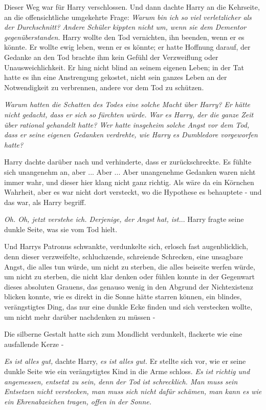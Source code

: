 Dieser Weg war für Harry verschlossen. Und dann dachte Harry an die Kehrseite,
an die offensichtliche umgekehrte Frage: \emph{Warum bin ich so viel
verletzlicher als der Durchschnitt? Andere Schüler kippten nicht um, wenn sie
dem Dementor gegenüberstanden.} Harry wollte den Tod vernichten, ihn beenden,
wenn er es könnte. Er wollte ewig leben, wenn er es könnte; er hatte Hoffnung
darauf, der Gedanke an den Tod brachte ihm kein Gefühl der Verzweiflung oder
Unausweichlichkeit. Er hing nicht blind an seinem eigenen Leben; in der Tat
hatte es ihn eine Anstrengung gekostet, nicht sein ganzes Leben an der
Notwendigkeit zu verbrennen, andere vor dem Tod zu schützen.

\emph{Warum hatten die Schatten des Todes eine solche Macht über Harry? Er hätte
nicht gedacht, dass er sich so fürchten würde. War es Harry, der die ganze Zeit
über} \emph{rational gehandelt hatte? Wer hatte insgeheim solche Angst vor dem
Tod, dass er seine eigenen Gedanken verdrehte, wie Harry es Dumbledore
vorgeworfen hatte?}

Harry dachte darüber nach und verhinderte, dass er zurückschreckte. Es fühlte
sich unangenehm an, aber ... Aber ... Aber unangenehme Gedanken waren nicht immer
wahr, und dieser hier klang nicht ganz richtig. Als wäre da ein Körnchen
Wahrheit, aber es war nicht dort versteckt, wo die Hypothese es behauptete - und
das war, als Harry begriff.

\emph{Oh. Oh, jetzt verstehe ich. Derjenige, der Angst hat, ist.}.. Harry fragte
seine dunkle Seite, was sie vom Tod hielt.

Und Harrys Patronus schwankte, verdunkelte sich, erlosch fast augenblicklich,
denn dieser verzweifelte, schluchzende, schreiende Schrecken, eine unsagbare
Angst, die alles tun würde, um nicht zu sterben, die alles beiseite werfen
würde, um nicht zu sterben, die nicht klar denken oder fühlen konnte in der
Gegenwart dieses absoluten Grauens, das genauso wenig in den Abgrund der
Nichtexistenz blicken konnte, wie es direkt in die Sonne hätte starren können,
ein blindes, verängstigtes Ding, das nur eine dunkle Ecke finden und sich
verstecken wollte, um nicht mehr darüber nachdenken zu müssen -

Die silberne Gestalt hatte sich zum Mondlicht verdunkelt, flackerte wie eine
ausfallende Kerze -

\emph{Es ist alles gut,} dachte Harry,\emph{ es ist alles gut.} Er stellte sich
vor, wie er seine dunkle Seite wie ein verängstigtes Kind in die Arme schloss.
\emph{Es ist richtig und angemessen, entsetzt zu sein, denn der Tod ist
schrecklich. Man muss sein Entsetzen nicht verstecken, man muss sich nicht dafür
schämen, man kann es wie ein Ehrenabzeichen tragen, offen in der Sonne.}


